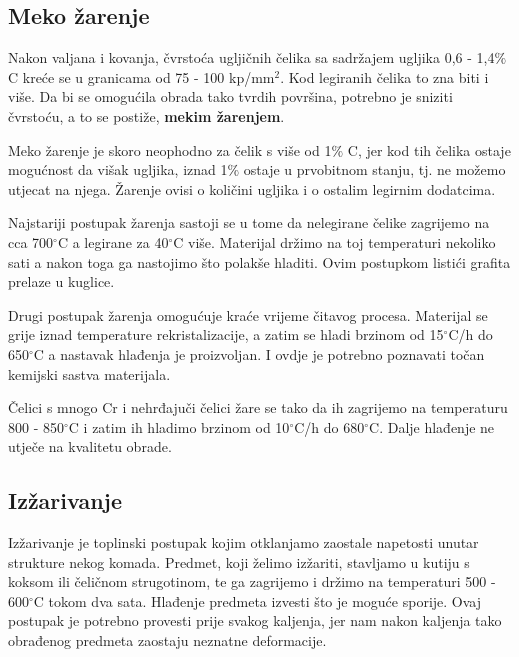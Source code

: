 \documentclass[a4paper,12pt]{article}
\numberwithin{figure}{section}
\begin{document}
\subsection{Meko žarenje}
Nakon valjana i kovanja, čvrstoća ugljičnih čelika sa sadržajem ugljika 0,6 - 1,4$\%$C kreće se u granicama od 75 - 100 kp/mm$^{2}$. Kod legiranih čelika to zna biti i više. Da bi se omogućila obrada tako tvrdih površina, potrebno je sniziti čvrstoću, a to se postiže, \textbf{mekim žarenjem}.\par
Meko žarenje je skoro neophodno za čelik s više od 1$\%$ C, jer kod tih čelika ostaje mogućnost da višak ugljika, iznad 1$\%$ ostaje u prvobitnom stanju, tj. ne možemo utjecat na njega. Žarenje ovisi o količini ugljika i o ostalim legirnim dodatcima.\par 
Najstariji postupak žarenja sastoji se u tome da nelegirane čelike zagrijemo na cca 700$^{\circ}$C a legirane za 40$^{\circ}$C više. Materijal držimo na toj temperaturi nekoliko sati a nakon toga ga nastojimo što polakše hladiti. Ovim postupkom listići grafita prelaze u kuglice. \par
Drugi postupak žarenja omogućuje kraće vrijeme čitavog procesa. Materijal se grije iznad temperature rekristalizacije, a zatim se hladi brzinom od 15$^{\circ}$C/h do 650$^{\circ}$C a nastavak hlađenja je proizvoljan. I ovdje je potrebno poznavati točan kemijski sastva materijala.\par
Čelici s mnogo Cr i nehrđajuči čelici žare se tako da ih zagrijemo na temperaturu 800 - 850$^{\circ}$C  i zatim ih hladimo brzinom od 10$^{\circ}$C/h do 680$^{\circ}$C. Dalje hlađenje ne utječe na kvalitetu obrade.
\subsection{Izžarivanje}
Izžarivanje je toplinski postupak kojim otklanjamo zaostale napetosti unutar strukture nekog komada. Predmet, koji želimo izžariti, stavljamo u kutiju s koksom ili čeličnom strugotinom, te ga zagrijemo i držimo na temperaturi 500 - 600$^{\circ}$C  tokom dva sata. Hlađenje predmeta izvesti što je moguće sporije. Ovaj postupak je potrebno provesti prije svakog kaljenja, jer nam nakon kaljenja tako obrađenog predmeta zaostaju neznatne deformacije.
\end{document}
